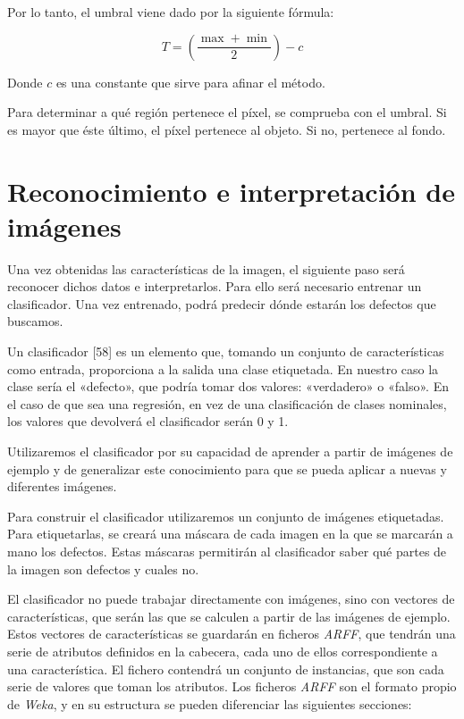 Por lo tanto, el umbral viene dado por la siguiente fórmula:

\[T = (\frac{\max+\min}{2})-c\]

Donde $c$ es una constante que sirve para afinar el método.

Para determinar a qué región pertenece el píxel, se comprueba con el umbral. Si es mayor que éste último, el píxel pertenece al objeto. Si no, pertenece al fondo.






\section{Reconocimiento e interpretación de imágenes}
Una vez obtenidas las características de la imagen, el siguiente paso será reconocer dichos datos e interpretarlos. Para ello será necesario entrenar un clasificador. Una vez entrenado, podrá predecir dónde estarán los defectos que buscamos.

Un clasificador [58] es un elemento que, tomando un conjunto de características como entrada, proporciona a la salida una clase etiquetada. En nuestro caso la clase sería el «defecto», que podría tomar dos valores: «verdadero» o «falso». En el caso de que sea una regresión, en vez de una clasificación de clases nominales, los valores que devolverá el clasificador serán 0 y 1.

Utilizaremos el clasificador por su capacidad de aprender a partir de imágenes de ejemplo y de generalizar este conocimiento para que se pueda aplicar a nuevas y diferentes imágenes.

Para construir el clasificador utilizaremos un conjunto de imágenes etiquetadas. Para etiquetarlas, se creará una máscara de cada imagen en la que se marcarán a mano los defectos. Estas máscaras permitirán al clasificador saber qué partes de la imagen son defectos y cuales no.

El clasificador no puede trabajar directamente con imágenes, sino con vectores de características, que serán las que se calculen a partir de las imágenes de ejemplo. Estos vectores de características se guardarán en ficheros \textit{ARFF}, que tendrán una serie de atributos definidos en la cabecera, cada uno de ellos correspondiente a una característica. El fichero contendrá un conjunto de instancias, que son cada serie de valores que toman los atributos. Los ficheros \textit{ARFF} son el formato propio de \textit{Weka}, y en su estructura se pueden diferenciar las siguientes secciones:

